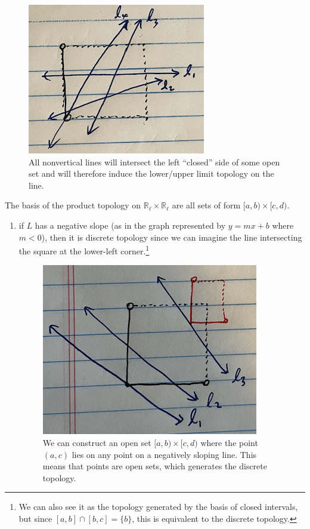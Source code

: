 \begin{solution}[Munkres 16.8]
\begin{enumerate}
      \begin{figure}[H]
        \centering 
        \includegraphics[scale=0.4]{img/2.png}
        \caption{All nonvertical lines will intersect the left ``closed'' side of some open set and will therefore induce the lower/upper limit topology on the line.}
        \label{fig:2}
      \end{figure}
    \end{enumerate}
    The basis of the product topology on $\mathbb{R}_\ell \times \mathbb{R}_\ell$ are all sets of form $[a, b) \times [c, d)$. 
    \begin{enumerate} 
      \item if $L$ has a negative slope (as in the graph represented by $y = mx + b$ where $m < 0$), then it is discrete topology since we can imagine the line intersecting the square at the lower-left corner.\footnote{We can also see it as the topology generated by the basis of closed intervals, but since $[a, b] \cap [b, c] = \{b\}$, this is equivalent to the discrete topology.} 

      \begin{figure}[H]
        \centering 
        \includegraphics[scale=0.4]{img/3.png}
        \caption{We can construct an open set $[a, b) \times [c, d)$ where the point $(a, c)$ lies on any point on a negatively sloping line. This means that points are open sets, which generates the discrete topology. } 
        \label{fig:3}
      \end{figure}


\end{enumerate}
\end{solution}
